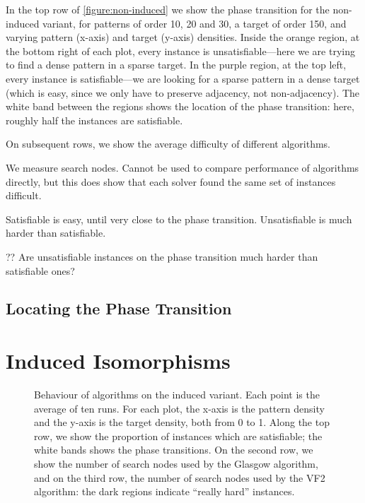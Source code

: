 \documentclass[letterpaper]{article}
\begin{document}
In the top row of \cref{figure:non-induced} we show the phase transition for the non-induced
variant, for patterns of order 10, 20 and 30, a target of order 150, and varying pattern (x-axis)
and target (y-axis) densities. Inside the orange region, at the bottom right of each plot, every
instance is unsatisfiable---here we are trying to find a dense pattern in a sparse target. In the
purple region, at the top left, every instance is satisfiable---we are looking for a sparse pattern
in a dense target (which is easy, since we only have to preserve adjacency, not non-adjacency). The
white band between the regions shows the location of the phase transition: here, roughly half the
instances are satisfiable.

On subsequent rows, we show the average difficulty of different algorithms.

We measure search nodes. Cannot be used to compare performance of algorithms directly, but this does
show that each solver found the same set of instances difficult.

Satisfiable is easy, until very close to the phase transition. Unsatisfiable is much harder than
satisfiable.

?? Are unsatisfiable instances on the phase transition much harder than satisfiable ones?

\subsection{Locating the Phase Transition}

\section{Induced Isomorphisms}

\begin{figure*}
    \hskip-1.2cm
    \setlength{\abovecaptionskip}{-2em}
    \caption{Behaviour of algorithms on the induced variant. Each point is the average of ten
        runs. For each plot, the x-axis is the pattern density and the y-axis is the target
        density, both from 0 to 1. Along the top row, we show the proportion of instances which are
        satisfiable; the white bands shows the phase transitions. On the second row, we show the
        number of search nodes used by the Glasgow algorithm, and on the third row, the number of
        search nodes used by the VF2 algorithm: the dark regions indicate ``really hard''
        instances.}\label{figure:induced}
\end{figure*}
\end{document}
